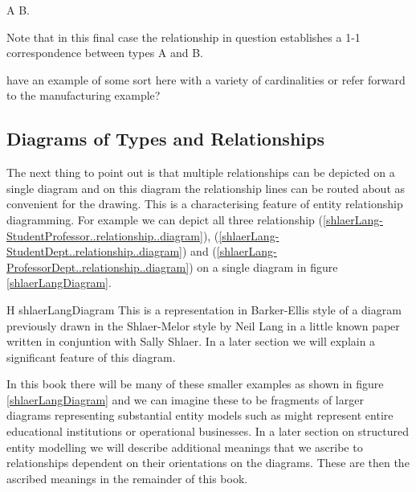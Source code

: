A\,\barkerEllisH\,B.

Note that in this final case the relationship in question establishes a 1-1 correspondence between types A and B.

\begin{noteforfuture}
have an example of some sort here with a variety of cardinalities or refer forward to the manufacturing example?
\end{noteforfuture}

\subsection{Diagrams of Types and Relationships}
The next thing to point out is that multiple relationships can be depicted on a single diagram and 
on this diagram the relationship lines can be routed about as convenient for the drawing. 
This is a characterising feature of entity relationship diagramming.
For example we can depict all three relationship 
(\ref{shlaerLang-StudentProfessor..relationship..diagram}), 
(\ref{shlaerLang-StudentDept..relationship..diagram}) and 
(\ref{shlaerLang-ProfessorDept..relationship..diagram}) on a single diagram in figure \ref{shlaerLangDiagram}.
\begin{erboxedFigure}{H}
{shlaerLangDiagram}
{This is a representation in Barker-Ellis style of a diagram  previously drawn 
in the Shlaer-Melor style by Neil Lang 
 in a  little known paper written  in conjuntion with Sally Shlaer. In a later section we will explain 
 a significant feature of this diagram.}

\end{erboxedFigure}

 In this book there will be many of these smaller examples as shown in figure \ref{shlaerLangDiagram} and we can imagine  these to be fragments of larger diagrams  representing substantial entity models such as 
 might represent entire educational institutions or operational businesses. 
In a later section on structured entity modelling we will describe additional meanings that we ascribe to relationships dependent on their orientations on the diagrams. These are then the ascribed meanings in the remainder of this book. 

